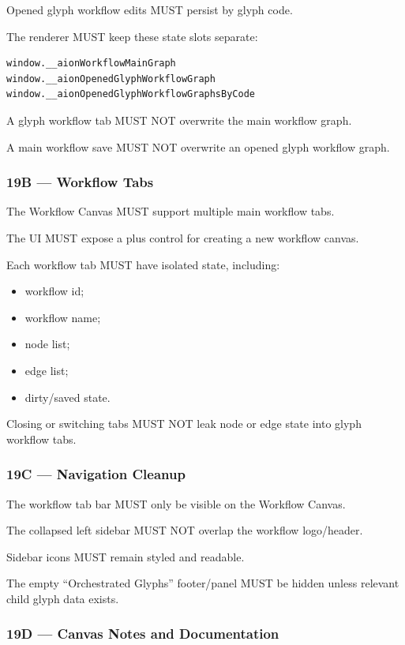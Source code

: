 Opened glyph workflow edits MUST persist by glyph code.

The renderer MUST keep these state slots separate:

\begin{verbatim}
window.__aionWorkflowMainGraph
window.__aionOpenedGlyphWorkflowGraph
window.__aionOpenedGlyphWorkflowGraphsByCode
\end{verbatim}

A glyph workflow tab MUST NOT overwrite the main workflow graph.

A main workflow save MUST NOT overwrite an opened glyph workflow graph.

\subsubsection{19B --- Workflow Tabs}

The Workflow Canvas MUST support multiple main workflow tabs.

The UI MUST expose a plus control for creating a new workflow canvas.

Each workflow tab MUST have isolated state, including:

\begin{itemize}
  \item workflow id;
  \item workflow name;
  \item node list;
  \item edge list;
  \item dirty/saved state.
\end{itemize}

Closing or switching tabs MUST NOT leak node or edge state into glyph workflow tabs.

\subsubsection{19C --- Navigation Cleanup}

The workflow tab bar MUST only be visible on the Workflow Canvas.

The collapsed left sidebar MUST NOT overlap the workflow logo/header.

Sidebar icons MUST remain styled and readable.

The empty ``Orchestrated Glyphs'' footer/panel MUST be hidden unless relevant child glyph data exists.

\subsubsection{19D --- Canvas Notes and Documentation}


